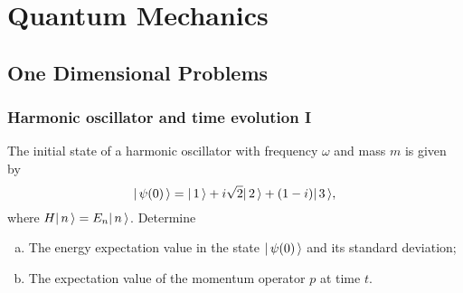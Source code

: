 \chapter{Quantum Mechanics}
\label{ch: quantum-mechanics}
\section{One Dimensional Problems}
\subsection{Harmonic oscillator and time evolution I}
The initial state of a harmonic oscillator with frequency $\omega$ and mass $m$ is given by
\begin{equation}
    | \,  \psi (0)  \, \rangle = | \, 1 \, \rangle + i \sqrt{2} | \, 2 \, \rangle + (1-i) | \, 3 \, \rangle,
\end{equation}
where $H | \, n \, \rangle = E_n | \, n \, \rangle $. Determine
\begin{enumerate}[(a)]
    \item The energy expectation value in the state $| \, \psi (0) \, \rangle$ and its standard deviation;
    \item The expectation value of the momentum operator $p$ at time $t$. 
\end{enumerate}

